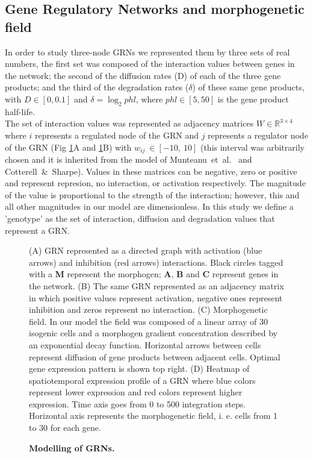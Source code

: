 \documentclass[10pt,letterpaper]{article}
\begin{document}
\subsection*{Gene Regulatory Networks and morphogenetic field}

In order to study three-node GRNs we represented them by three sets of real
numbers, the first set was composed of the interaction values
between genes in the network; the second of the diffusion rates (D) of each of
the three gene products; and the third of the degradation rates ($\delta$) of
these same gene products, with $D \in [0, 0.1]$ and $\delta = \log_{2}phl$, where
$phl \in [5, 50]$ is the gene product half-life.\\

The set of interaction values was represented as adjacency matrices $W \in
\mathbb{R}^{3\times4}$ where $i$ represents a regulated node of the GRN and $j$
represents a regulator node of the GRN (Fig \ref{fig:model}A and
\ref{fig:model}B) with $w_{\textit{ij}}~\in [-10,\ 10]$ (this interval was arbitrarily
chosen and it is inherited from the model of Munteanu~et~al.~\cite{munteanu_2014}
and Cotterell~\&~Sharpe\cite{Cotterell2010}). Values in these
matrices can be negative, zero or positive and represent represion, no
interaction, or activation respectively. The magnitude of the value is
proportional to the strength of the interaction; however, this and all other
magnitudes in our model are dimensionless. In this study we define
a 'genotype' as the set of interaction, diffusion and degradation values that
represent a GRN.\\

\begin{figure}[!h]
    \caption{\bf Modelling of GRNs.}
    (A) GRN represented as a directed graph with activation (blue arrows) and
    inhibition (red arrows) interactions. Black circles
    tagged with a \textbf{M} represent the morphogen; \textbf{A}, \textbf{B} and
    \textbf{C} represent genes in the network.
    (B) The same GRN represented as an adjacency matrix in which positive values
    represent activation, negative ones represent inhibition and
    zeros represent no interaction.
    (C) Morphogenetic field. In our model the field was composed of a linear
    array of 30 isogenic cells and a morphogen gradient concentration described
    by an exponential decay function. Horizontal arrows between cells represent
    diffusion of gene products between adjacent cells. Optimal gene expression
    pattern is shown top right.
    (D) Heatmap of spatiotemporal expression profile of a GRN where blue
    colors represent lower expression and red colors represent higher
    expression. Time axis goes from 0 to 500 integration steps. Horizontal
    axis represents the morphogenetic field, i. e. cells from 1 to 30 for
    each gene.
 \label{fig:model}
\end{figure}
\end{document}
